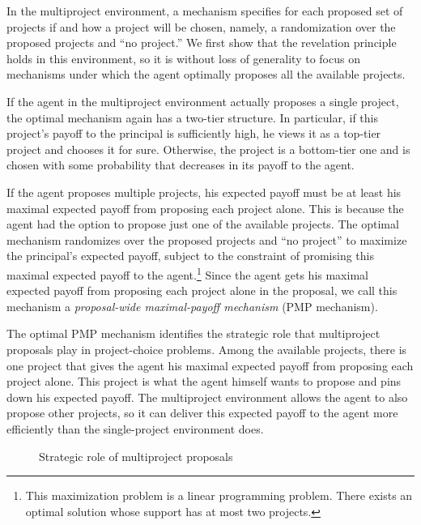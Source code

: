 \documentclass[12pt,english]{article}
\theoremstyle{remark}
\theoremstyle{plain}
\theoremstyle{definition}
\begin{document}
In the multiproject environment, a mechanism specifies for each proposed set of projects if and how a project will be chosen, namely, a randomization over the proposed projects and ``no project.'' We first show that the revelation principle holds in this environment, so it is without loss of generality to focus on mechanisms under which the agent optimally proposes all the available projects. 

If the agent in the multiproject environment actually proposes a single project, the optimal mechanism again has a two-tier structure. In particular, if this project's payoff to the principal is sufficiently high, he views it as a top-tier project and chooses it for sure. Otherwise, the project is a bottom-tier one and is chosen with some probability that decreases in its payoff to the agent. 

If the agent proposes multiple projects, his expected payoff must be at least his maximal expected payoff from proposing each project alone. This is because the agent had the option to propose just one of the available projects. The optimal mechanism randomizes over the proposed projects and ``no project'' to maximize the principal's expected payoff, subject to the constraint of promising this maximal expected payoff to the agent.\footnote{This maximization problem is a linear programming problem. There exists an optimal solution whose support has at most two projects.} Since the agent gets his maximal expected payoff from proposing each project alone in the proposal, we call this mechanism a \emph{proposal-wide maximal-payoff mechanism} (PMP mechanism). 

The optimal PMP mechanism identifies the strategic role that multiproject proposals play in project-choice problems. Among the available projects, there is one project that gives the agent his maximal expected payoff from proposing each project alone. This project is what the agent himself wants to propose and pins down his expected payoff. The multiproject environment allows the agent to also propose other projects, so it can deliver this expected payoff to the agent more efficiently than the single-project environment does. 


\begin{figure}[htb!]
\begin{center}

\end{center}
\vspace{-6 mm}
\caption{Strategic role of multiproject proposals}
\label{fg:intro}
\end{figure}
\end{document}
